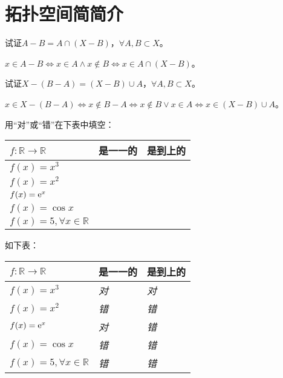
\chapter{拓扑空间简简介}

\begin{xiti}
	\item 试证$\displaystyle A-B=A\cap (X-B)$，$\displaystyle \forall A,B\subset X$。
	
	\begin{zm}
			$  x\in A-B \iff x\in A \wedge x\notin B\iff x\in A\cap (X-B) $。 
	\end{zm}
	
	\item 试证$X-(B-A)=(X-B)\cup A$，$ \forall A,B\subset X$。
	
	\begin{zm}
		$ x\in X-(B-A) \iff x\notin B-A \iff x\notin B \vee x\in A \iff x\in (X-B)\cup A $。
	\end{zm}
	
	\item 用“对”或“错”在下表中填空：
	\begin{table}[htb]
		\begin{tabularx}{\textwidth}{YYY}
			\toprule
			$f\colon \mathbb{R}\rightarrow \mathbb{R} $&是一一的&是到上的\\
			\midrule
			$f(x)=x^3 $& & \\
			$f(x)=x^2$& &\\
			$f(x)=\mathrm{e}^{x}$&&\\
			$f(x)=\cos x$&&\\
			$f(x)=5,\forall x\in \mathbb{R}$&&\\
			\bottomrule
		\end{tabularx}
	\end{table}
	
	\begin{jie}
		如下表：
		\begin{table}[htb]
			\begin{tabularx}{\textwidth}{YYY}
				\toprule
				$f\colon \mathbb{R}\rightarrow \mathbb{R} $&是一一的&是到上的\\
				\midrule
				$f(x)=x^3$&\textit{对} &\textit{对}\\
				$f(x)=x^2 $&\textit{错} &\textit{错}\\
				$f(x)=\mathrm{e}^{x}$&\textit{对}&\textit{错}\\
				$f(x)=\cos x$&\textit{错}&\textit{错}\\
				$f(x)=5,\forall x\in \mathbb{R}$&\textit{错}&\textit{错}\\
				\bottomrule
			\end{tabularx}
		\end{table}
	\end{jie}
	

\end{xiti}

